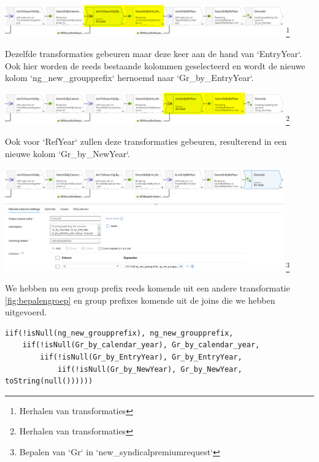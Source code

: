 \begin{center}
    \includegraphics[width=0.9\textwidth]{./graphics/adf/gr_3.png}
    \footnote{Herhalen van transformaties}
\end{center}

Dezelfde transformaties gebeuren maar deze keer aan de hand van `EntryYear`. Ook hier worden de reeds bestaande kolommen geselecteerd en wordt de nieuwe kolom `ng\_new\_groupprefix` hernoemd naar `Gr\_by\_EntryYear`.

\begin{center}
    \includegraphics[width=0.9\textwidth]{./graphics/adf/gr_4.png}
    \footnote{Herhalen van transformaties}
\end{center}

Ook voor `RefYear` zullen deze transformaties gebeuren, resulterend in een nieuwe kolom `Gr\_by\_NewYear`.

\begin{center}
    \includegraphics[width=0.9\textwidth]{./graphics/adf/gr_5.png}
    \footnote{Bepalen van `Gr` in `new\_syndicalpremiumrequest`}
\end{center}

We hebben nu een group prefix reeds komende uit een andere transformatie \ref{fig:bepalengroep} en group prefixes komende uit de joins die we hebben uitgevoerd.

\begin{verbatim}
iif(!isNull(ng_new_groupprefix), ng_new_groupprefix, 
    iif(!isNull(Gr_by_calendar_year), Gr_by_calendar_year,
        iif(!isNull(Gr_by_EntryYear), Gr_by_EntryYear,
            iif(!isNull(Gr_by_NewYear), Gr_by_NewYear, toString(null())))))
\end{verbatim}

